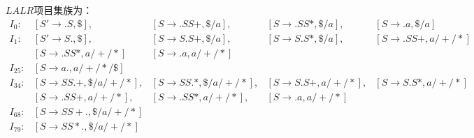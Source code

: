 \documentclass[UTF8,noindent]{ctexart}
\begin{document}

$LALR$项目集族为：
\begin{align*}
  I_0: & [S'\rightarrow .S, \$], & [S\rightarrow .SS+, \$/a], & [S\rightarrow .SS*, \$/a], & [S\rightarrow .a, \$/a]\\
  I_1: & [S'\rightarrow S., \$],   & [S\rightarrow S.S+, \$/a], & [S\rightarrow S.S*, \$/a], & [S\rightarrow .SS+, a/+/*]\\
& [S\rightarrow .SS*, a/+/*] & [S\rightarrow .a, a/+/*] &\  &\ \\
I_{25}:  & [ S\rightarrow a., a/+/*/\$ ] & & &\\
I_{34}:  & [S\rightarrow SS.+, \$/a/+/*], & [S\rightarrow SS.*, \$/a/+/*], &[S\rightarrow S.S+, a/+/*], &[S\rightarrow S.S*, a/+/*]\\
       & [S\rightarrow .SS+, a/+/*], &[S\rightarrow .SS*, a/+/*], &[S\rightarrow .a, a/+/*] &\\
	   I_{68}: &[S\rightarrow SS+., \$/a/+/*]& & &\\
  I_{79}: &[S\rightarrow SS*., \$/a/+/*] & & &\\
\end{align*}
\end{document}
